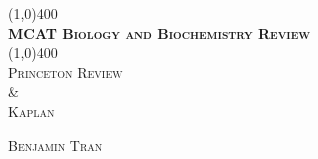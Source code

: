\documentclass[10pt,letterpaper]{report}
\makeatletter
\let\org@subfile
\renewcommand*{}[1]{%
  \filename@parse{#1}%
  \expandafter
  \graphicspath\expandafter{\expandafter{\filename@area/images/}}%
  \org@subfile{#1}%
}
\makeatother
\begin{document}
\begin{titlepage}
	\begin{center}
		\line(1,0){400}\\
		[0.25in]
		\huge{\bfseries \textsc{MCAT Biology and Biochemistry Review}}\\
		[0.10in]
		\line(1,0){400}\\
		\textsc{Princeton Review}\\
		\& \\
		\textsc{Kaplan\supdag}\\
		[10cm]
	\end{center}
	
	\begin{flushright}
		\textsc{Benjamin Tran}
	\end{flushright}
\end{titlepage}
	
	\tableofcontents
	\thispagestyle{empty}
	\clearpage

	\setcounter{page}{1}
	\setcounter{chapter}{1}

	
	
	
	
	
	
\end{document}
